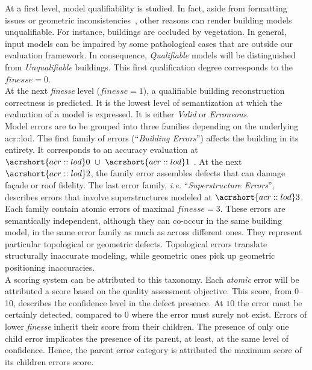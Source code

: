 \documentclass[runningheads]{llncs}
\begin{document}
At a first level, model qualifiability is studied. In fact, aside from formatting issues or geometric inconsistencies~\cite{ledoux2018val3dity}, other reasons can render building models unqualifiable. For instance, buildings are occluded by vegetation. In general, input models can be impaired by some pathological cases that are outside our evaluation framework. In consequence, \textit{Qualifiable} models will be distinguished from \textit{Unqualifiable} buildings. This first qualification degree corresponds to the $\textit{finesse} = 0$.\\

At the next \textit{finesse} level ($\textit{finesse} = 1$), a qualifiable building reconstruction correctness is predicted. It is the lowest level of semantization at which the evaluation of a model is expressed. It is either \textit{Valid} or \textit{Erroneous}.\\

Model errors are to be grouped into three families depending on the underlying \acrshort{acr::lod}. The first family of errors (``\textit{Building Errors}'') affects the building in its entirety. It corresponds to an accuracy evaluation at $\acrshort{acr::lod}0\text{ } \cup \text{ }\acrshort{acr::lod}1$ . At the next $\acrshort{acr::lod}2$, the family error assembles defects that can damage fa\c{c}ade or roof fidelity. The last error family, \textit{i.e.} ``\textit{Superstructure Errors}'', describes errors that involve superstructures modeled at $\acrshort{acr::lod}3$.\\

Each family contain atomic errors of maximal $\textit{finesse} = 3$. These errors are semantically independent, although they can co-occur in the same building model, in the same error family as much as across different ones. They represent particular topological or geometric defects. Topological errors translate structurally inaccurate modeling, while geometric ones pick up geometric positioning inaccuracies.\\

A scoring system can be attributed to this taxonomy. Each \textit{atomic} error will be attributed a score based on the quality assessment objective. This score, from \SIrange{0}{10}{}, describes the confidence level in the defect presence. At $10$ the error must be certainly detected, compared to $0$ where the error must surely not exist. Errors of lower \textit{finesse} inherit their score from their children. The presence of only one child error implicates the presence of its parent, at least, at the same level of confidence. Hence, the parent error category is attributed the maximum score of its children errors score.\\
\end{document}
